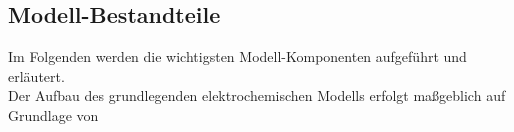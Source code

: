 \documentclass[onecolumn,10pt,titlepage]{article}
\begin{document}
%	
\subsection{Modell-Bestandteile}
Im Folgenden werden die wichtigsten Modell-Komponenten aufgeführt und erläutert.\\
Der Aufbau des grundlegenden elektrochemischen Modells erfolgt maßgeblich auf Grundlage von \cite{Chandesris2015,Schalenbach2013,Tjarks.2017,EspinosaLopez.2018,Gabrielli2016}
\end{document}
